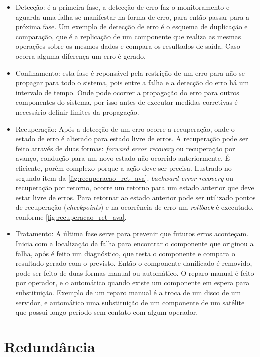 \begin{itemize}
 \item Detecção: é a primeira fase, a detecção de erro faz o monitoramento e aguarda uma falha se manifestar na forma de erro, para então
 passar para a próxima fase. Um exemplo de detecção de erro é o esquema de duplicação e comparação, que é a replicação de um componente
 que realiza as mesmas operações sobre os mesmos dados e compara os resultados de saída. Caso ocorra alguma diferença um erro é gerado.
 \item Confinamento: esta fase é reponsável pela restrição de um erro para não se propagar para todo o sistema, pois entre a falha e a
 detecção do erro há um intervalo de tempo. Onde pode ocorrer a propagação do erro para outros componentes do sistema, por isso antes de
 executar medidas corretivas é necessário definir limites da propagação.
 \item Recuperação: Após a detecção de um erro ocorre a recuperação, onde o estado de erro é alterado para estado livre de erros. A recuperação
 pode ser feito através de duas formas:
 \subitem \textit{forward error recovery} ou recuperação por avanço, condução para um novo estado não ocorrido anteriormente. É eficiente, porém
 complexo porque a ação deve ser precisa. Ilustrado no segundo item da \ref{fig:recuperacao_ret_ava}.
 \subitem \textit{backward error recovery} ou recuperação por retorno, ocorre um retorno para um estado anterior que deve estar livre de erros.
 Para retornar ao estado anterior pode ser utilizado pontos de recuperação (\textit{checkpoints}) e na ocorrência de erro um \textit{rollback} 
 é executado, conforme \ref{fig:recuperacao_ret_ava}.
 \item Tratamento: A última fase serve para prevenir que futuros erros aconteçam. Inicia com a localização da falha para encontrar o componente
 que originou a falha, após é feito um diagnóstico, que testa o componente e compara o resultado gerado com o previsto. Então o componente 
 danificado é removido, pode ser feito de duas formas manual ou automático. O reparo manual é feito por operador, e o automático quando existe
 um componente em espera para substituição. Exemplo de um reparo manual é a troca de um disco de um servidor, e automático uma substituição
 de um componente de um satélite que possui longo período sem contato com algum operador.
\end{itemize}

\section{Redundância}

